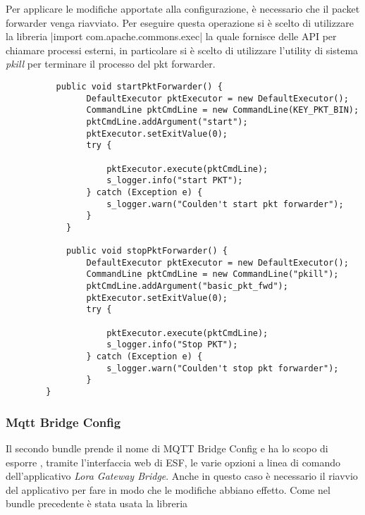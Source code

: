 Per applicare le modifiche apportate alla configurazione, è necessario che
il packet forwarder venga riavviato. Per eseguire questa operazione si è scelto di
utilizzare la libreria 
|import com.apache.commons.exec|
la quale fornisce delle API per chiamare processi esterni, in particolare
si è scelto di utilizzare l'utility di sistema \emph{pkill} per terminare il
processo del pkt forwarder.
\begin{verbatim}
          public void startPktForwarder() {
                DefaultExecutor pktExecutor = new DefaultExecutor();
                CommandLine pktCmdLine = new CommandLine(KEY_PKT_BIN);
                pktCmdLine.addArgument("start");
                pktExecutor.setExitValue(0);
                try {

                    pktExecutor.execute(pktCmdLine);
                    s_logger.info("start PKT");
                } catch (Exception e) {
                    s_logger.warn("Coulden't start pkt forwarder");
                }
            }

            public void stopPktForwarder() {
                DefaultExecutor pktExecutor = new DefaultExecutor();
                CommandLine pktCmdLine = new CommandLine("pkill");
                pktCmdLine.addArgument("basic_pkt_fwd");
                pktExecutor.setExitValue(0);
                try {

                    pktExecutor.execute(pktCmdLine);
                    s_logger.info("Stop PKT");
                } catch (Exception e) {
                    s_logger.warn("Coulden't stop pkt forwarder");
                }
        }

\end{verbatim}




\subsubsection{Mqtt Bridge Config}
Il secondo bundle prende il nome di MQTT Bridge Config e ha lo scopo 
di esporre , tramite l'interfaccia web di ESF, le varie opzioni a linea di
comando dell'applicativo
 \emph{Lora Gateway Bridge}.  Anche in questo caso è necessario il
riavvio del applicativo per fare in modo che le modifiche abbiano effetto. 
Come nel bundle precedente è stata usata la libreria


